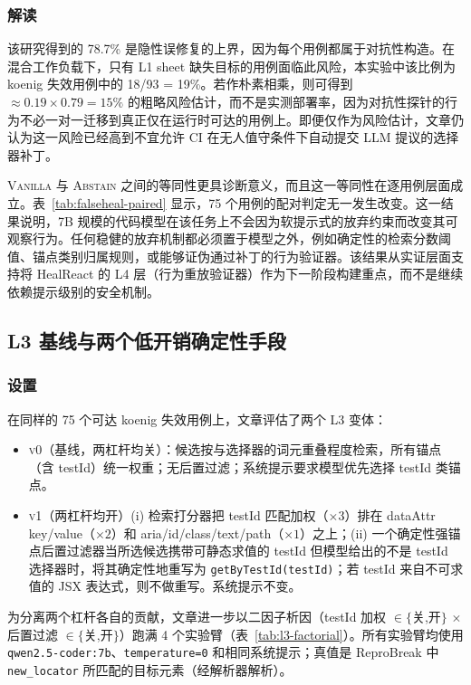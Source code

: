 \subsubsection{解读}
该研究得到的 78.7\% 是隐性误修复的上界，因为每个用例都属于对抗性构造。在混合工作负载下，只有 L1 sheet 缺失目标的用例面临此风险，本实验中该比例为 koenig 失效用例中的 18/93 = 19\%。若作朴素相乘，则可得到 $\approx 0.19 \times 0.79 = 15\%$ 的粗略风险估计，而不是实测部署率，因为对抗性探针的行为不必一对一迁移到真正仅在运行时可达的用例上。即便仅作为风险估计，文章仍认为这一风险已经高到不宜允许 CI 在无人值守条件下自动提交 LLM 提议的选择器补丁。

\textsc{Vanilla} 与 \textsc{Abstain} 之间的等同性更具诊断意义，而且这一等同性在逐用例层面成立。表~\ref{tab:falseheal-paired} 显示，75 个用例的配对判定无一发生改变。这一结果说明，7B 规模的代码模型在该任务上不会因为软提示式的放弃约束而改变其可观察行为。任何稳健的放弃机制都必须置于模型之外，例如确定性的检索分数阈值、锚点类别归属规则，或能够证伪通过补丁的行为验证器。该结果从实证层面支持将 HealReact 的 L4 层（行为重放验证器）作为下一阶段构建重点，而不是继续依赖提示级别的安全机制。

\subsection{L3 基线与两个低开销确定性手段}
\label{sec:f2}

\subsubsection{设置}
在同样的 75 个可达 koenig 失效用例上，文章评估了两个 L3 变体：
\begin{itemize}
\item \textsc{v0（基线，两杠杆均关）}：候选按与选择器的词元重叠程度检索，所有锚点（含 testId）统一权重；无后置过滤；系统提示要求模型优先选择 testId 类锚点。
\item \textsc{v1（两杠杆均开）}(i) 检索打分器把 testId 匹配加权（$\times 3$）排在 dataAttr key/value（$\times 2$）和 aria/id/class/text/path（$\times 1$）之上；(ii) 一个确定性强锚点后置过滤器当所选候选携带可静态求值的 testId 但模型给出的不是 testId 选择器时，将其确定性地重写为 \texttt{getByTestId(testId)}；若 testId 来自不可求值的 JSX 表达式，则不做重写。系统提示不变。
\end{itemize}

为分离两个杠杆各自的贡献，文章进一步以二因子析因（testId 加权 $\in\{$关,开$\}$ $\times$ 后置过滤 $\in\{$关,开$\}$）跑满 4 个实验臂（表~\ref{tab:l3-factorial}）。所有实验臂均使用 \texttt{qwen2.5-coder:7b}、\texttt{temperature=0} 和相同系统提示；真值是 ReproBreak 中 \texttt{new\_locator} 所匹配的目标元素（经解析器解析）。

